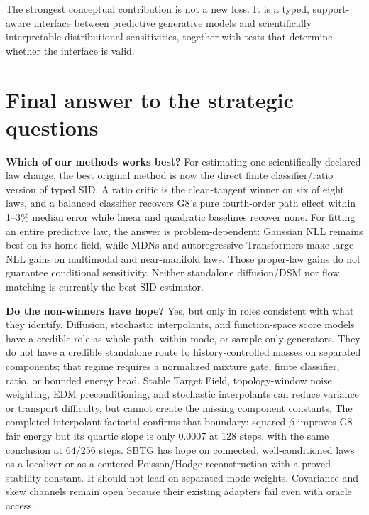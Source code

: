 \documentclass[10pt]{article}
\begin{document}
The strongest conceptual contribution is not a new loss. It is a typed, support-aware interface between predictive generative models and scientifically interpretable distributional sensitivities, together with tests that determine whether the interface is valid.



\section{Final answer to the strategic questions}

\textbf{Which of our methods works best?}  For estimating one scientifically
declared law change, the best original method is now the direct finite
classifier/ratio version of typed SID.  A ratio critic is the clean-tangent winner
on six of eight laws, and a balanced classifier recovers G8's pure fourth-order
path effect within 1--3\% median error while linear and quadratic baselines recover
none.  For fitting an entire predictive law, the answer is problem-dependent:
Gaussian NLL remains best on its home field, while MDNs and autoregressive
Transformers make large NLL gains on multimodal and near-manifold laws.  Those
proper-law gains do not guarantee conditional sensitivity.  Neither standalone
diffusion/DSM nor flow matching is currently the best SID estimator.

\textbf{Do the non-winners have hope?}  Yes, but only in roles consistent with
what they identify.  Diffusion, stochastic interpolants, and function-space score models have a credible
role as whole-path, within-mode, or sample-only generators.  They do not have a
credible standalone route to history-controlled masses on separated components;
that regime requires a normalized mixture gate, finite classifier, ratio, or
bounded energy head.  Stable Target Field, topology-window noise weighting, EDM
preconditioning, and stochastic interpolants can reduce variance or transport
difficulty, but cannot create the missing component constants.  The completed
interpolant factorial confirms that boundary: squared $\beta$ improves G8 fair
energy but its quartic slope is only 0.0007 at 128 steps, with the same conclusion
at 64/256 steps.  SBTG has hope on
connected, well-conditioned laws as a localizer or as a centered Poisson/Hodge
reconstruction with a proved stability constant.  It should not lead on separated
mode weights.  Covariance and skew channels remain open because their existing
adapters fail even with oracle access.
\end{document}
